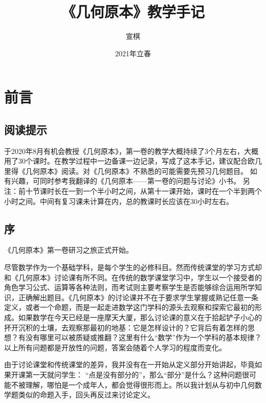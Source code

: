 \documentclass[
]{book}
\title{《几何原本》教学手记}
\author{宣棋}
\date{2021年立春}
\begin{document}
\maketitle

{
\setcounter{tocdepth}{1}
\tableofcontents
}
\hypertarget{ux524dux8a00}{%
\chapter{前言}\label{ux524dux8a00}}

\hypertarget{ux9605ux8bfbux63d0ux793a}{%
\section*{阅读提示}\label{ux9605ux8bfbux63d0ux793a}}

于2020年8月有机会教授《几何原本》，第一卷的教学大概持续了3个月左右，大概用了30个课时。在教学过程中一边备课一边记录，写成了这本手记，建议配合欧几里得《几何原本》阅读。对《几何原本》不熟悉的可能需要先预习几何题目。
如有兴趣，可同时参考我翻译的《几何原本------第一卷的问题与讨论》小书。
另注：前十节课时长在一到一个半小时之间，从第十一课开始，课时在一个半到两个小时之间。中间有复习课未计算在内，总的教课时长应该在30小时左右。

\hypertarget{ux5e8f}{%
\section*{序}\label{ux5e8f}}

《几何原本》第一卷研习之旅正式开始。

尽管数学作为一个基础学科，是每个学生的必修科目。然而传统课堂的学习方式却和《几何原本》讨论课有所不同。在传统的数学课堂学习中，学生以一个接受者的角色学习公式、运算等各种法则，而考试则主要考察学生是否能够综合运用所学知识，正确解出题目。《几何原本》的讨论课并不在于要求学生掌握或熟记任意一条定义，或者一个命题，而是一起走进数学这门学科的源头去观察和探索它最初的形成。如果数学在今天已经是一座摩天大厦，那么讨论课的意义在于拾起铲子小心的抔开沉积的土壤，去观察那最初的地基：它是怎样设计的？它背后有着怎样的思想？有没有哪里可以被质疑或推翻？这里有什么``数学''作为一个学科的基本规律？以上所有问题都是开放性的问题，答案会随着个人学习的程度而变化。

由于讨论课堂和传统课堂的差异，我并没有在一开始从定义部分开始讲起，毕竟如果开课第一天就问学生： ``点是没有部分的''，那么``部分''是什么？这种问题很可能不被理解，哪怕是一个成年人，都会觉得很形而上。所以我计划从与初中几何数学题类似的命题入手，回头再反过来讨论定义。
\end{document}

